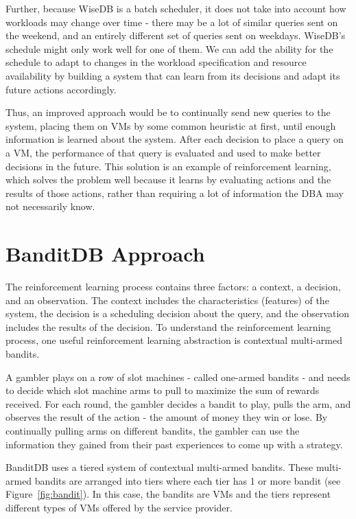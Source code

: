 \documentclass{brandiss}
\numberwithin{section}{chapter}
\numberwithin{figure}{chapter}
\theoremstyle{definition}
\theoremstyle{plain}
\theoremstyle{remark}
\begin{document}
Further, because WiseDB is a batch scheduler, it does not take into account how workloads may change over time - there may be a lot of similar queries sent on the weekend, and an entirely different set of queries sent on weekdays. WiseDB's schedule might only work well for one of them. We can add the ability for the schedule to adapt to changes in the workload specification and resource availability by building a system that can learn from its decisions and adapt its future actions accordingly.

Thus, an improved approach would be to continually send new queries to the system, placing them on VMs by some common heuristic at first, until enough information is learned about the system. After each decision to place a query on a VM, the performance of that query is evaluated and used to make better decisions in the future. This solution is an example of reinforcement learning, which solves the problem well because it learns by evaluating actions and the results of those actions, rather than requiring a lot of information the DBA may not necessarily know.

\section{BanditDB Approach}

The reinforcement learning process contains three factors: a context, a decision, and an observation. The context includes the characteristics (features) of the system, the decision is a scheduling decision about the query, and the observation includes the results of the decision. To understand the reinforcement learning process, one useful reinforcement learning abstraction is contextual multi-armed bandits.

A gambler plays on a row of slot machines - called one-armed bandits - and needs to decide which slot machine arms to pull to maximize the sum of rewards received. For each round, the gambler decides a bandit to play, pulls the arm, and observes the result of the action - the amount of money they win or lose. By continually pulling arms on different bandits, the gambler can use the information they gained from their past experiences to come up with a strategy.

BanditDB uses a tiered system of contextual multi-armed bandits. These multi-armed bandits are arranged into tiers where each tier has 1 or more bandit (see Figure~\ref{fig:bandit}). In this case, the bandits are VMs and the tiers represent different types of VMs offered by the service provider.
\end{document}
